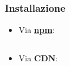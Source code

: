 
        \begin{frame}[fragile]{\insertsectionhead}
        \subsubsection{Installazione}\label{subsec:install}
        \begin{block}{\insertsubsubsectionhead}
            \begin{itemize}
                \item
                    Via \textbf{\url{npm}}:
                    \inputminted[fontsize=\scriptsize]{text}{src/npm_install.sh}
                \item
                    Via \textbf{\footnotesize CDN}:
                    \inputminted[fontsize=\scriptsize]{text}{src/cdn_install.html}
            \end{itemize}
        \end{block}
        \end{frame}

